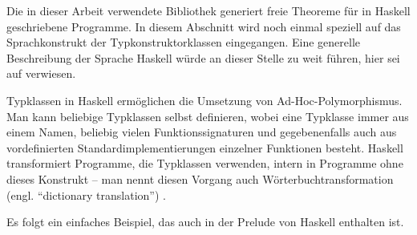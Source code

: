 Die in dieser Arbeit verwendete Bibliothek generiert freie Theoreme für in Haskell geschriebene Programme. In diesem Abschnitt wird noch einmal speziell auf das Sprachkonstrukt der Typkonstruktorklassen eingegangen.
Eine generelle Beschreibung der Sprache Haskell würde an dieser Stelle zu weit führen, hier sei auf \cite{haskell} verwiesen.







Typklassen in Haskell ermöglichen die Umsetzung von Ad-Hoc-Polymorphismus. Man kann beliebige Typklassen selbst definieren,
wobei eine Typklasse immer aus einem Namen, beliebig vielen Funktionssignaturen und gegebenenfalls auch aus vordefinierten
Standardimplementierungen einzelner Funktionen besteht. Haskell transformiert Programme, die Typklassen verwenden, intern in Programme
ohne dieses Konstrukt -- man nennt diesen Vorgang auch Wörterbuchtransformation (engl. ``dictionary translation'') \cite{jones}.

Es folgt ein einfaches Beispiel, das auch in der Prelude von Haskell enthalten ist.

